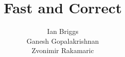 \documentclass{acm_proc_article-sp}
\begin{document}
\title{Fast and Correct}


%
%
%
%
%

%
\author{
%
%
\alignauthor
Ian Briggs\\
\alignauthor
Ganesh Gopalakrishnan\\
\alignauthor
Zvonimir Rakamaric\\
}
\end{document}
